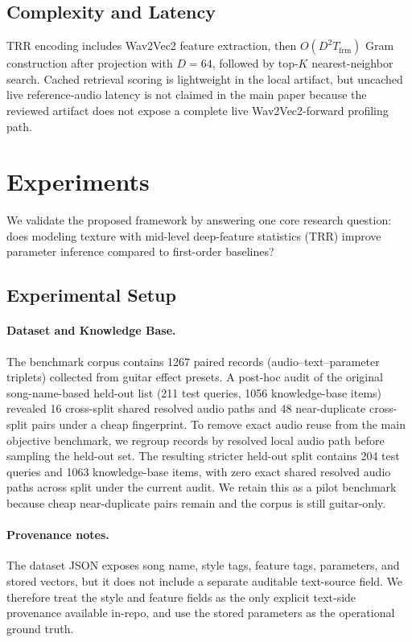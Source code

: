 \subsection{Complexity and Latency}
\label{ssec:complexity_latency}
TRR encoding includes Wav2Vec2 feature extraction, then $O(D^2T_{\mathrm{frm}})$ Gram construction after projection with $D=64$, followed by top-$K$ nearest-neighbor search. Cached retrieval scoring is lightweight in the local artifact, but uncached live reference-audio latency is not claimed in the main paper because the reviewed artifact does not expose a complete live Wav2Vec2-forward profiling path.

\section{Experiments}
\label{sec:experiments}

We validate the proposed framework by answering one core research question: does modeling texture with mid-level deep-feature statistics (TRR) improve parameter inference compared to first-order baselines?

\subsection{Experimental Setup}

\paragraph{Dataset and Knowledge Base.}
The benchmark corpus contains 1267 paired records (audio--text--parameter triplets) collected from guitar effect presets. A post-hoc audit of the original song-name-based held-out list (211 test queries, 1056 knowledge-base items) revealed 16 cross-split shared resolved audio paths and 48 near-duplicate cross-split pairs under a cheap fingerprint. To remove exact audio reuse from the main objective benchmark, we regroup records by resolved local audio path before sampling the held-out set. The resulting stricter held-out split contains 204 test queries and 1063 knowledge-base items, with zero exact shared resolved audio paths across split under the current audit. We retain this as a pilot benchmark because cheap near-duplicate pairs remain and the corpus is still guitar-only.

\paragraph{Provenance notes.}
The dataset JSON exposes song name, style tags, feature tags, parameters, and stored vectors, but it does not include a separate auditable text-source field. We therefore treat the style and feature fields as the only explicit text-side provenance available in-repo, and use the stored parameters as the operational ground truth.

